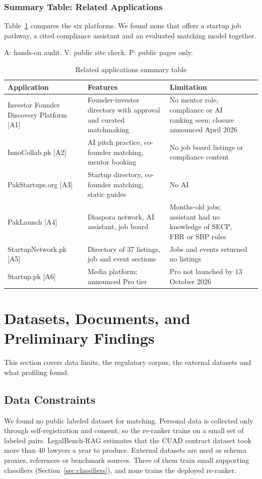 \documentclass{FastFyp}
\makeatletter
\newcommand{\src}[1]{[#1]}
\newcommand{\capdesc}[1]{%
  \par\nobreak
  \begingroup
  \setstretch{1}%
  \ifdefstring{\@captype}{figure}%
    {\vspace{0.2\baselineskip}}%
    {\vspace{-0.8\baselineskip}}%
  {\centering\normalfont\itshape\small
   \begin{minipage}{0.92\textwidth}\centering #1\end{minipage}\par}%
  \endgroup
  \vspace{0.4\baselineskip}%
}
\makeatother
\begin{document}
\subsubsection{Summary Table: Related Applications}
Table~\ref{tab:lr-applications} compares the six platforms. We found none that offers a startup job pathway, a cited compliance assistant and an evaluated matching model together.
\begin{table}[!ht]
\centering
\caption{Related applications summary table}
\capdesc{A: hands-on audit. V: public site check. P: public pages only.}
\begin{tabular}{|p{2.7cm}|p{3.8cm}|p{3.6cm}|p{4.4cm}|}
\hline
\textbf{Application} & \textbf{Features} & \textbf{Limitation} \\
\hline
Investor Founder Discovery Platform \src{A1} & Founder-investor directory with approval and curated matchmaking & No mentor role, compliance or AI ranking seen; closure announced April 2026 \\
\hline
InnoCollab.pk \src{A2} & AI pitch practice, co-founder matching, mentor booking & No job board listings or compliance content \\
\hline
PakStartups.org \src{A3} & Startup directory, co-founder matching, static guides & No AI \\
\hline
PakLaunch \src{A4} & Diaspora network, AI assistant, job board & Months-old jobs; assistant had no knowledge of SECP, FBR or SBP rules \\
\hline
StartupNetwork.pk \src{A5} & Directory of 37 listings, job and event sections & Jobs and events returned no listings \\
\hline
Startup.pk \src{A6} & Media platform; announced Pro tier & Pro not launched by 13 October 2026 \\
\hline
\end{tabular}
\label{tab:lr-applications}
\end{table}

\section{Datasets, Documents, and Preliminary Findings}\label{sec:datasets}
This section covers data limits, the regulatory corpus, the external datasets and what profiling found.

\subsection{Data Constraints}
We found no public labeled dataset for matching. Personal data is collected only through self-registration and consent, so the re-ranker trains on a small set of labeled pairs. LegalBench-RAG \cite{ref:pipitone2024legalbench} estimates that the CUAD contract dataset took more than 40 lawyers a year to produce. External datasets are used as schema proxies, references or benchmark sources. Three of them train small supporting classifiers (Section~\ref{sec:classifiers}), and none trains the deployed re-ranker.
\end{document}
